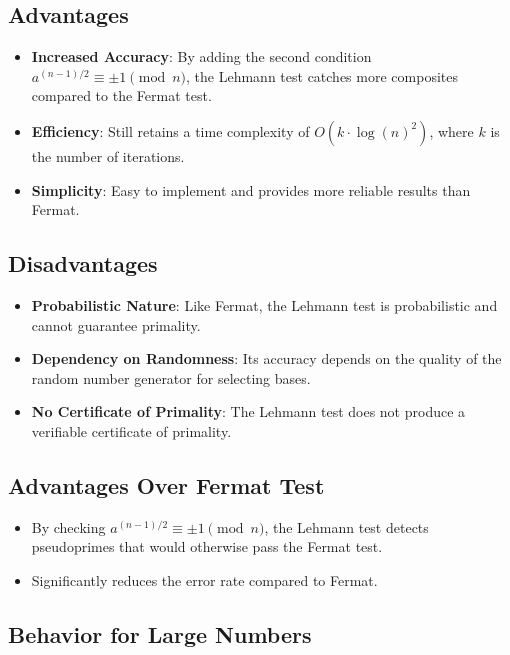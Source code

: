 \documentclass[12pt]{article}
\begin{document}
\subsection*{Advantages}

\begin{itemize}
    \item \textbf{Increased Accuracy}: By adding the second condition \( a^{(n-1)/2} \equiv \pm1 \pmod{n} \), the Lehmann test catches more composites compared to the Fermat test.
    \item \textbf{Efficiency}: Still retains a time complexity of \( O(k \cdot \log(n)^2) \), where \( k \) is the number of iterations.
    \item \textbf{Simplicity}: Easy to implement and provides more reliable results than Fermat.
\end{itemize}

\subsection*{Disadvantages}

\begin{itemize}
    \item \textbf{Probabilistic Nature}: Like Fermat, the Lehmann test is probabilistic and cannot guarantee primality.
    \item \textbf{Dependency on Randomness}: Its accuracy depends on the quality of the random number generator for selecting bases.
    \item \textbf{No Certificate of Primality}: The Lehmann test does not produce a verifiable certificate of primality.
\end{itemize}

\subsection*{Advantages Over Fermat Test}

\begin{itemize}
    \item By checking \( a^{(n-1)/2} \equiv \pm1 \pmod{n} \), the Lehmann test detects pseudoprimes that would otherwise pass the Fermat test.
    \item Significantly reduces the error rate compared to Fermat.
\end{itemize}

\subsection*{Behavior for Large Numbers}
\end{document}
